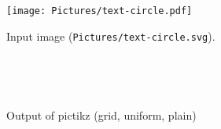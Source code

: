 \documentclass{article}
\begin{document}
\begin{figure}[H]
 \centering
 \texttt{[image: Pictures/text-circle.pdf]}
 \caption{Input image (\texttt{Pictures/text-circle.svg}).}
 \end{figure}

 \begin{figure}[H]
 \centering
 \begin{tikzpicture}[scale=1.5]
 
 \end{tikzpicture}~
 \begin{tikzpicture}[scale=1.5]
 
 \end{tikzpicture}~
 \begin{tikzpicture}[scale=1.5]
 
 \end{tikzpicture}
 \caption{Output of pictikz (grid, uniform, plain)}
 \end{figure}\clearpage
\end{document}
